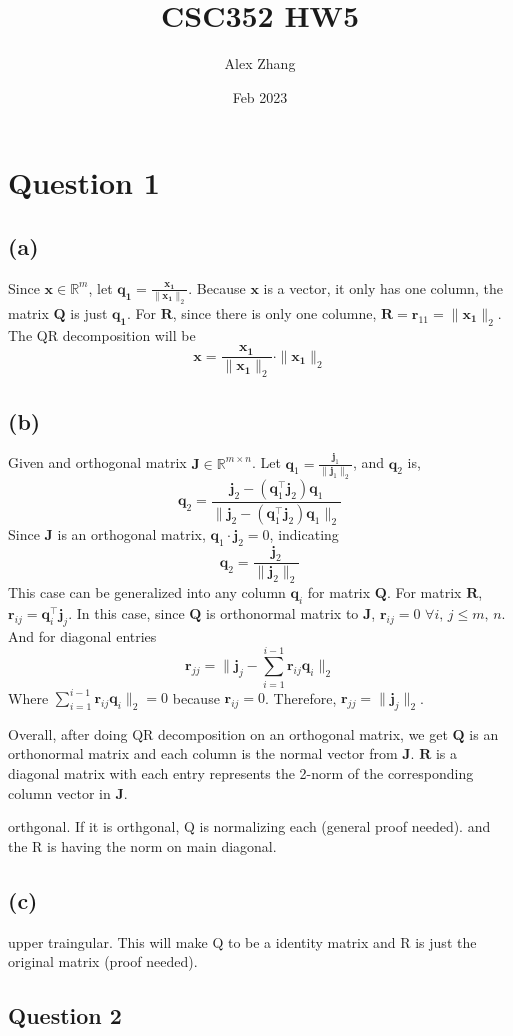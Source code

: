 \documentclass{article}
\title{CSC352 HW5}
\author{Alex Zhang}
\date{Feb 2023}
\newcommand{\mat}[1]{\mathbf{#1}}
\begin{document}
\maketitle

\section*{Question 1}

\subsection*{(a)}
Since $\mat{x} \in \mathbb{R}^m$, let $\mat{q_1} = \frac{\mat{x_1}}{\|\mat{x_1}\|_2}$. Because $\mat{x}$ is a vector, it only has one column, the
matrix $\mat{Q}$ is just $\mat{q_1}$. For $\mat{R}$, since there is only one columne, $\mat{R} = \mat{r}_{11} = \|\mat{x_1} \|_2$. The QR
decomposition will be 
$$\mat{x} = \frac{\mat{x_1}}{\|\mat{x_1}\|_2} \cdot  \|\mat{x_1} \|_2$$

\subsection*{(b)}
Given and orthogonal matrix $\mat{J} \in \mathbb{R}^{m \times n}$. Let $\mat{q}_1 = \frac{\mat{j}_1}{\|\mat{j}_1\|_2}$, and $\mat{q}_2$ is,
$$\mat{q}_2= \frac{\mat{j}_2-(\mat{q}_1^\top\mat{j}_2)\mat{q}_1}{\|\mat{j}_2-(\mat{q}_1^\top\mat{j}_2)\mat{q}_1\|_2}$$
Since $\mat{J}$ is an orthogonal matrix, $\mat{q}_1 \cdot \mat{j}_2 = 0$, indicating
$$\mat{q}_2 = \frac{\mat{j}_2}{\|\mat{j}_2\|_2}$$
This case can be generalized into any column $\mat{q}_i$ for matrix $\mat{Q}$. For matrix $\mat{R}$, $\mat{r}_{ij} = \mat{q}_i^\top \mat{j}_j$.
In this case, since $\mat{Q}$ is orthonormal matrix to $\mat{J}$, $\mat{r}_{ij} = 0$ $ \forall i \mbox{, } j \leq m \mbox{, } n$. And for diagonal entries
$$\mat{r}_{jj} = \|\mat{j}_j -\sum^{i-1}_{i=1}\mat{r}_{ij}\mat{q}_i\|_2$$
Where $\sum^{i-1}_{i=1}\mat{r}_{ij}\mat{q}_i\|_2 = 0$ because $\mat{r}_{ij} = 0$. Therefore, $\mat{r}_{jj} = \|\mat{j}_j\|_2$.

Overall, after doing QR decomposition on an orthogonal matrix, we get $\mat{Q}$ is an orthonormal matrix and each column is the normal vector from $\mat{J}$.
$\mat{R}$ is a diagonal matrix with each entry represents the 2-norm of the corresponding column vector in $\mat{J}$.








orthgonal. If it is orthgonal, Q is normalizing each (general proof needed). and the R is having the norm on main diagonal.


\subsection*{(c)}
upper traingular. This will make Q to be a identity matrix and R is just the original matrix (proof needed).

\subsection*{Question 2}
\end{document}
